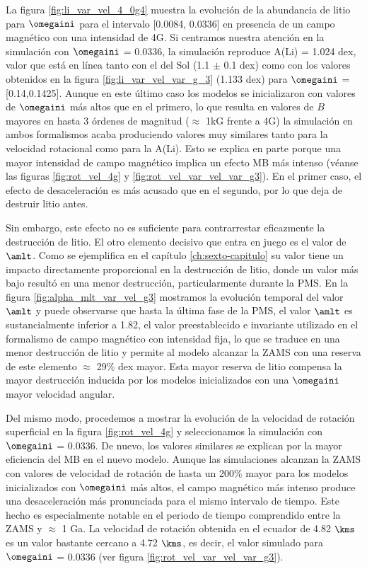 La figura \ref{fig:li_var_vel_4_0g4} muestra la evolución de la abundancia de litio para $\omegaini$ para el intervalo [0.0084, 0.0336] en presencia de un campo magnético con una intensidad de 4G. Si centramos nuestra atención en la simulación con $\omegaini$ = 0.0336, la simulación reproduce A(Li) = 1.024 dex, valor que está en línea tanto con el del Sol (1.1 $\pm$ 0.1 dex) como con los valores obtenidos en la figura \ref{fig:li_var_vel_var_g_3} (1.133 dex) para $\omegaini$ = [0.14,0.1425]. Aunque en este último caso los modelos se inicializaron con valores de $\omegaini$ más altos que en el primero, lo que resulta en valores de $B$ mayores en hasta 3 órdenes de magnitud ($\approx$ 1kG frente a 4G) la simulación en ambos formalismos acaba produciendo valores muy similares tanto para la velocidad rotacional como para la A(Li). Esto se explica en parte porque una mayor intensidad de campo magnético implica un efecto MB más intenso (véanse las figuras \ref{fig:rot_vel_4g} y \ref{fig:rot_vel_var_vel_var_g3}). En el primer caso, el efecto de desaceleración es más acusado que en el segundo, por lo que deja de destruir litio antes.\par

Sin embargo, este efecto no es suficiente para contrarrestar eficazmente la destrucción de litio. El otro elemento decisivo que entra en juego es el valor de $\amlt$. Como se ejemplifica en el capítulo \ref{ch:sexto-capitulo} su valor tiene un impacto directamente proporcional en la destrucción de litio, donde un valor más bajo resultó en una menor destrucción, particularmente durante la PMS. En la figura \ref{fig:alpha_mlt_var_vel_g3} mostramos la evolución temporal del valor $\amlt$ y puede observarse que hasta la última fase de la PMS, el valor $\amlt$ es sustancialmente inferior a 1.82, el valor preestablecido e invariante utilizado en el formalismo de campo magnético con intensidad fija, lo que se traduce en una menor destrucción de litio y permite al modelo alcanzar la ZAMS con una reserva de este elemento $\approx$ 29\% dex mayor. Esta mayor reserva de litio compensa la mayor destrucción inducida por los modelos inicializados con una $\omegaini$ mayor velocidad angular.\par

Del mismo modo, procedemos a mostrar la evolución de la velocidad de rotación superficial en la figura \ref{fig:rot_vel_4g} y seleccionamos la simulación con $\omegaini$ = 0.0336. De nuevo, los valores similares se explican por la mayor eficiencia del MB en el nuevo modelo. Aunque las simulaciones alcanzan la ZAMS con valores de velocidad de rotación de hasta un 200\% mayor para los modelos inicializados con $\omegaini$ más altos, el campo magnético más intenso produce una desaceleración más pronunciada para el mismo intervalo de tiempo. Este hecho es especialmente notable en el periodo de tiempo comprendido entre la ZAMS y $\approx$ 1 Ga. La velocidad de rotación obtenida en el ecuador de 4.82 $\kms$ es un valor bastante cercano a 4.72 $\kms$, es decir, el valor simulado para $\omegaini$ = 0.0336 (ver figura \ref{fig:rot_vel_var_vel_var_g3}).\par

